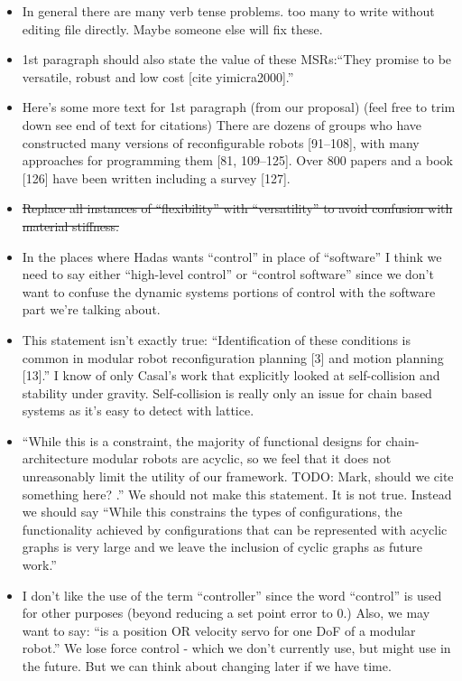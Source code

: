 \documentclass[12pt]{article}
\begin{document}
\begin{itemize}
\item In general there are many verb tense problems. too many to write without editing file directly. Maybe someone else will fix these.
\item 1st paragraph should also state the value of these MSRs:“They promise to be versatile, robust and low cost [cite yimicra2000].”
\item Here’s some more text for 1st paragraph (from our proposal) (feel free to trim down see end of text for citations) There are dozens of groups who have constructed many versions of reconfigurable robots [91–108], with many approaches for programming them [81, 109–125]. Over 800 papers and a book [126] have been written including a survey [127].
\item \sout{Replace all instances of “flexibility” with “versatility” to avoid confusion with material stiffness.}
\item In the places where Hadas wants “control” in place of “software” I think we need to say either “high-level control” or “control software” since we don’t want to confuse the dynamic systems portions of control with the software part we’re talking about.
\item This statement isn’t exactly true: “Identification of these conditions is common in modular robot reconfiguration planning [3] and motion planning [13].”  I know of only Casal's work that explicitly looked at self-collision and stability under gravity.  Self-collision is really only an issue for chain based systems as it’s easy to detect with lattice.
\item “While this is a constraint, the majority of functional designs for chain-architecture modular robots are acyclic, so we feel that it does not unreasonably limit the utility of our framework. TODO: Mark, should we cite something here? .”
We should not make this statement. It is not true. Instead we should say “While this constrains the types of configurations,  the functionality achieved by configurations that can be represented with acyclic graphs is very large and we leave the inclusion of cyclic graphs as future work.”
\item I don’t like the use of the term “controller” since the word “control” is used for other purposes (beyond reducing a set point error to 0.) Also, we may want to say: “is a position OR velocity servo for one DoF of a modular robot.”  We lose force control - which we don’t currently use, but might use in the future. But we can think about changing later if we have time.

\end{itemize}
\end{document}

